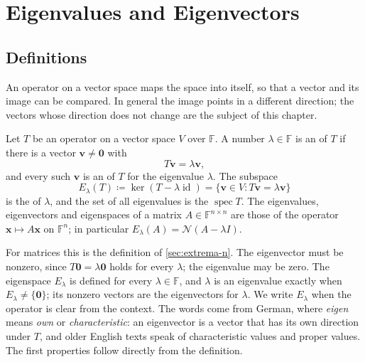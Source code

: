 \section{Eigenvalues and Eigenvectors}
\label{sec:eigen-definitions}

\subsection{Definitions}

An operator on a vector space maps the space into itself, so that a vector and its image can be compared. In general the image points in a different direction; the vectors whose direction does not change are the subject of this chapter.

\begin{definition}
\label{def:eigenvalue}
Let $T$ be an operator on a vector space $V$ over $\mathbb F$. A number $\lambda\in\mathbb F$ is an  of $T$ if there is a vector $\mathbf v\ne\mathbf 0$ with
\[
T\mathbf v=\lambda\mathbf v ,
\]
and every such $\mathbf v$ is an  of $T$ for the eigenvalue $\lambda$. The subspace
\[
E_\lambda(T)\coloneqq\ker(T-\lambda\operatorname{id})=\{\mathbf v\in V: T\mathbf v=\lambda\mathbf v\}
\]
is the  of $\lambda$, and the set of all eigenvalues is the  $\operatorname{spec}T$. The eigenvalues, eigenvectors and eigenspaces of a matrix $A\in\mathbb F^{n\times n}$ are those of the operator $\mathbf x\mapsto A\mathbf x$ on $\mathbb F^n$; in particular $E_\lambda(A)=\mathcal N(A-\lambda I)$.
\end{definition}

For matrices this is the definition of \cref{sec:extrema-n}. The eigenvector must be nonzero, since $T\mathbf 0=\lambda\mathbf 0$ holds for every $\lambda$; the eigenvalue may be zero. The eigenspace $E_\lambda$ is defined for every $\lambda\in\mathbb F$, and $\lambda$ is an eigenvalue exactly when $E_\lambda\ne\{\mathbf 0\}$; its nonzero vectors are the eigenvectors for $\lambda$. We write $E_\lambda$ when the operator is clear from the context. The words come from German, where \emph{eigen} means \emph{own} or \emph{characteristic}: an eigenvector is a vector that has its own direction under $T$, and older English texts speak of characteristic values and proper values. The first properties follow directly from the definition.


